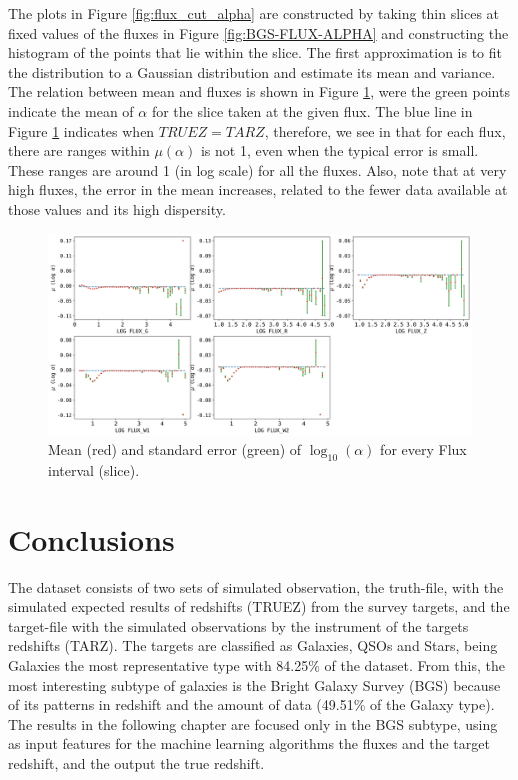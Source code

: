 The plots in Figure \ref{fig:flux_cut_alpha} are constructed by taking thin slices at fixed values of the fluxes in Figure \ref{fig:BGS-FLUX-ALPHA} and constructing the histogram of the points that lie within the slice. The first approximation is to fit the distribution to a Gaussian distribution and estimate its mean and variance. The relation between mean and fluxes is shown in Figure \ref{fig:media_alpha_flux}, were the green points indicate the mean of $\alpha$ for the slice taken at the given flux. The blue line in Figure \ref{fig:media_alpha_flux} indicates when $TRUEZ = TARZ$, therefore, we see in that for each flux, there are ranges within $\mu(\alpha)$ is not 1, even when the typical error is small. These ranges are around 1 (in log scale) for all the fluxes. Also, note that at very high fluxes, the error in the mean increases, related to the fewer data available at those values and its high dispersity. 
\begin{figure}[!htbp]
	\centering
	\includegraphics[width=1.0\linewidth]{TeX_files/Imagenes/media_alpha_flux}
	\caption{Mean (red) and standard error (green) of $\log_{10}(\alpha)$ for every Flux interval (slice).}
	\label{fig:media_alpha_flux}
\end{figure}

\section{Conclusions}
The dataset consists of two sets of simulated observation, the truth-file, with the simulated expected results of redshifts (TRUEZ) from the survey targets, and the target-file with the simulated observations by the instrument of the targets redshifts (TARZ). The targets are classified as Galaxies, QSOs and Stars, being Galaxies the most representative type with 84.25\% of the dataset. From this, the most interesting subtype of galaxies is the Bright Galaxy Survey (BGS) because of its patterns in redshift and the amount of data (49.51\% of the Galaxy type). The results in the following chapter are focused only in the BGS subtype, using as input features for the machine learning algorithms the fluxes and the target redshift, and the output the true redshift. 